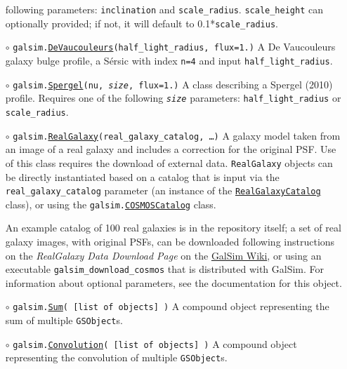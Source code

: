 \documentclass[preprint,10pt]{../../devel/modules/aastex}
\begin{document}
\begin{itemize}
    following parameters: \texttt{inclination} and \texttt{scale\_radius}.
    \texttt{scale\_height} can optionally provided; if not, it will default to 0.1*\texttt{scale\_radius}.
\item[$\circ$]
  \texttt{galsim.}\href{http://galsim-developers.github.com/GalSim/classgalsim_1_1base_1_1_de_vaucouleurs.html}{\texttt{DeVaucouleurs}}\texttt{(half\_light\_radius, flux=1.)}
    \newline
    A De Vaucouleurs galaxy bulge profile, a S\'{e}rsic
    with index \texttt{n=4} and input \texttt{half\_light\_radius}.
\item[$\circ$]
  \texttt{galsim.}\href{http://galsim-developers.github.io/GalSim/classgalsim_1_1base_1_1_spergel.html}{\texttt{Spergel}}\texttt{(nu, \emph{size}, flux=1.)}
    \newline
    A class describing a Spergel (2010) profile.   Requires one of the
    following \texttt{\emph{size}} parameters: \texttt{half\_light\_radius} or \texttt{scale\_radius}.
\item[$\circ$]
  \texttt{galsim.}\href{http://galsim-developers.github.io/GalSim/classgalsim_1_1real_1_1_real_galaxy.html}{\texttt{RealGalaxy}}\texttt{(real\_galaxy\_catalog, \dots)}
    \newline
    A galaxy model taken from an image of a real galaxy and includes
    a correction for the original PSF.   Use of this class requires the
    download of external data.  \texttt{RealGalaxy} objects can be directly instantiated based on a catalog that
    is input via the
    \texttt{real\_galaxy\_catalog} parameter (an instance of the
    \href{http://galsim-developers.github.com/GalSim/classgalsim_1_1real_1_1_real_galaxy_catalog.html}{\texttt{RealGalaxyCatalog}}
    class), or using the \texttt{galsim.\href{http://galsim-developers.github.io/GalSim/classgalsim_1_1scene_1_1_c_o_s_m_o_s_catalog.html}{COSMOSCatalog}} class.

    An example catalog of 100 real galaxies is in the repository itself; a set of real
    galaxy images, with original PSFs, can be downloaded following instructions on the
    \emph{RealGalaxy Data Download Page} on the
    \href{https://github.com/GalSim-developers/GalSim/wiki/RealGalaxy\%20Data}{GalSim Wiki}, or
    using an executable \texttt{galsim\_download\_cosmos} that is distributed with GalSim. For information
    about  optional parameters, see the documentation for this object.
\item[$\circ$]
  \texttt{galsim.}\href{http://galsim-developers.github.io/GalSim/classgalsim_1_1compound_1_1_sum.html}{\texttt{Sum}}\texttt{( [list of objects] )}
    \newline
    A {compound} object representing the sum of multiple \texttt{GSObject}s.
\item[$\circ$]
  \texttt{galsim.}\href{http://galsim-developers.github.io/GalSim/classgalsim_1_1compound_1_1_convolution.html}{\texttt{Convolution}}\texttt{( [list of objects] )}
    \newline
    A compound object representing the convolution of multiple \texttt{GSObject}s.
\end{itemize}
\end{document}
